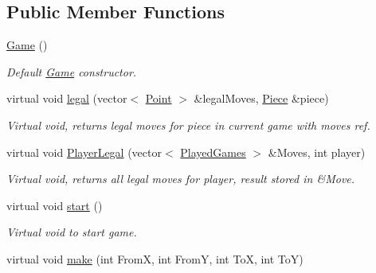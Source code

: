 \subsection*{Public Member Functions}
\begin{DoxyCompactItemize}
\item 
\hypertarget{class_game_ad59df6562a58a614fda24622d3715b65}{\hyperlink{class_game_ad59df6562a58a614fda24622d3715b65}{Game} ()}\label{class_game_ad59df6562a58a614fda24622d3715b65}

\begin{DoxyCompactList}\small\item\em Default \hyperlink{class_game}{Game} constructor. \end{DoxyCompactList}\item 
\hypertarget{class_game_a6e0ab8b7ceeecab810bbb69c183731d0}{virtual void \hyperlink{class_game_a6e0ab8b7ceeecab810bbb69c183731d0}{legal} (vector$<$ \hyperlink{struct_point}{Point} $>$ \&legal\-Moves, \hyperlink{class_piece}{Piece} \&piece)}\label{class_game_a6e0ab8b7ceeecab810bbb69c183731d0}

\begin{DoxyCompactList}\small\item\em Virtual void, returns legal moves for piece in current game with moves ref. \end{DoxyCompactList}\item 
\hypertarget{class_game_a7fef725397df911f2f78053433de7bf8}{virtual void \hyperlink{class_game_a7fef725397df911f2f78053433de7bf8}{Player\-Legal} (vector$<$ \hyperlink{struct_played_games}{Played\-Games} $>$ \&Moves, int player)}\label{class_game_a7fef725397df911f2f78053433de7bf8}

\begin{DoxyCompactList}\small\item\em Virtual void, returns all legal moves for player, result stored in \&Move. \end{DoxyCompactList}\item 
\hypertarget{class_game_a3d9b98f7c4a96ecf578f75b96c9f0e90}{virtual void \hyperlink{class_game_a3d9b98f7c4a96ecf578f75b96c9f0e90}{start} ()}\label{class_game_a3d9b98f7c4a96ecf578f75b96c9f0e90}

\begin{DoxyCompactList}\small\item\em Virtual void to start game. \end{DoxyCompactList}\item 
\hypertarget{class_game_a50b3e0e1e7a73793a9f9eae1b0660eff}{virtual void \hyperlink{class_game_a50b3e0e1e7a73793a9f9eae1b0660eff}{make} (int From\-X, int From\-Y, int To\-X, int To\-Y)}\label{class_game_a50b3e0e1e7a73793a9f9eae1b0660eff}


\end{DoxyCompactItemize}
